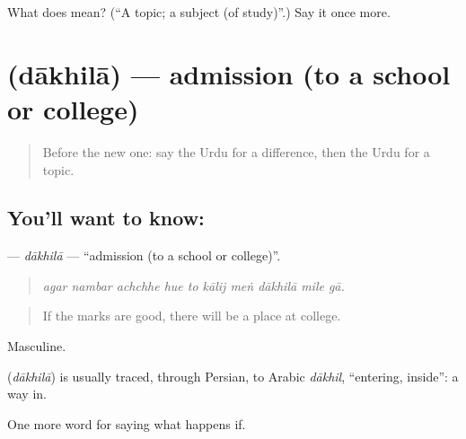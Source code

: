 \begin{tcolorbox}[breakable,colback=teal!4,colframe=teal!35!black,title={Before you move on}]
What does  mean? (\textquotedblleft{}A topic; a subject (of study)\textquotedblright{}.) Say it once more.
\end{tcolorbox}
\section[\texorpdfstring{\ur{داخلہ} (dākhilā)}{داخلہ (dākhilā)}]{ (dākhilā) — admission (to a school or college)}

\label{lesson:UR-C385-dakhila}



\begin{quote}
Before the new one: say the Urdu for a difference, then the Urdu for a topic.
\end{quote}

\subsection*{You'll want to know: }
\textbf{} — \emph{dākhilā} — \textquotedblleft{}admission (to a school or college)\textquotedblright{}.

\begin{quote}
         
\end{quote}

\begin{quote}
\emph{agar nambar achchhe hue to kālij meṅ dākhilā mile gā.}
\end{quote}

\begin{quote}
If the marks are good, there will be a place at college.
\end{quote}

Masculine.

\begin{cousinweb}
\textbf{} (\emph{dākhilā}) is usually traced, through Persian, to Arabic \emph{dākhil}, \textquotedblleft{}entering, inside\textquotedblright{}: a way in.
\end{cousinweb}

\begin{grammarlens}[title={What you've built}]
One more word for saying what happens if.
\end{grammarlens}

